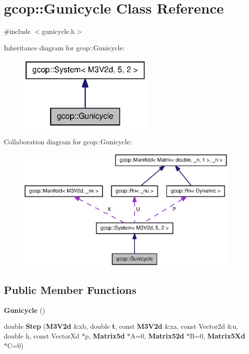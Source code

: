 \section{gcop\-:\-:\-Gunicycle \-Class \-Reference}
\label{classgcop_1_1Gunicycle}


{\ttfamily \#include $<$gunicycle.\-h$>$}



\-Inheritance diagram for gcop\-:\-:\-Gunicycle\-:
\nopagebreak
\begin{figure}[H]
\begin{center}
\leavevmode
\includegraphics[width=192pt]{classgcop_1_1Gunicycle__inherit__graph}
\end{center}
\end{figure}


\-Collaboration diagram for gcop\-:\-:\-Gunicycle\-:
\nopagebreak
\begin{figure}[H]
\begin{center}
\leavevmode
\includegraphics[width=350pt]{classgcop_1_1Gunicycle__coll__graph}
\end{center}
\end{figure}
\subsection*{\-Public \-Member \-Functions}
\begin{DoxyCompactItemize}
\item 
{\bf \-Gunicycle} ()
\item 
double {\bf \-Step} ({\bf \-M3\-V2d} \&xb, double {\bf t}, const {\bf \-M3\-V2d} \&xa, const \-Vector2d \&u, double h, const \-Vector\-Xd $\ast$p, {\bf \-Matrix5d} $\ast$\-A=0, {\bf \-Matrix52d} $\ast$\-B=0, {\bf \-Matrix5\-Xd} $\ast$\-C=0)
\end{DoxyCompactItemize}

